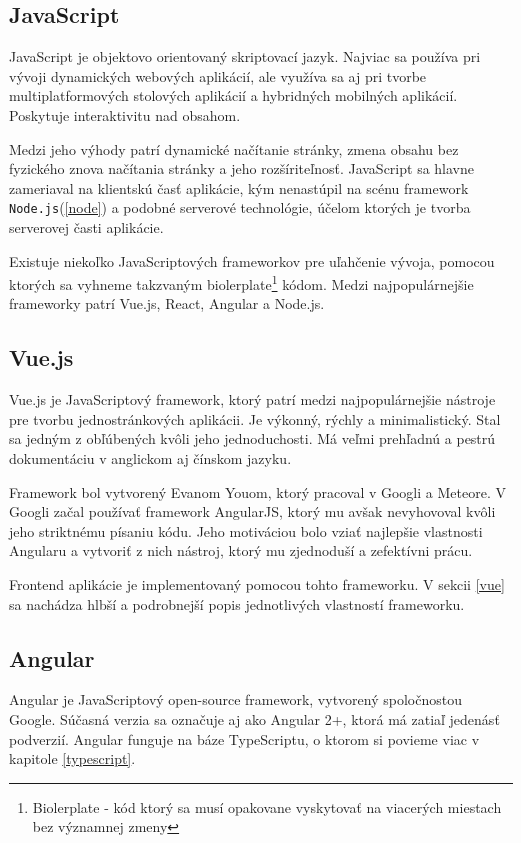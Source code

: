 \subsection{JavaScript}
JavaScript je objektovo orientovaný skriptovací jazyk. Najviac sa používa pri vývoji dynamických webových aplikácií, ale využíva sa aj pri tvorbe multiplatformových stolových aplikácií a hybridných mobilných aplikácií. Poskytuje interaktivitu nad obsahom. 

Medzi jeho výhody patrí dynamické načítanie stránky, zmena obsahu bez fyzického znova načítania stránky a jeho rozšíriteľnosť. JavaScript sa hlavne zameriaval na klientskú časť aplikácie, kým nenastúpil na scénu framework \texttt{Node.js}(\ref{node}) a podobné serverové technológie, účelom ktorých je tvorba serverovej časti aplikácie.

Existuje niekoľko JavaScriptových frameworkov pre uľahčenie vývoja, pomocou ktorých sa vyhneme takzvaným biolerplate\footnote{Biolerplate - kód ktorý sa musí opakovane vyskytovať na viacerých miestach bez významnej zmeny} kódom. Medzi najpopulárnejšie frameworky patrí Vue.js, React, Angular a Node.js.

\subsection{Vue.js}
Vue.js\cite{vue-guide} je JavaScriptový framework, ktorý patrí medzi najpopulárnejšie nástroje pre tvorbu jednostránkových aplikácii. Je výkonný, rýchly a minimalistický. Stal sa jedným z obľúbených kvôli jeho jednoduchosti. Má veľmi prehľadnú a pestrú dokumentáciu v anglickom aj čínskom jazyku.

Framework bol vytvorený Evanom Youom, ktorý pracoval v Googli a Meteore. V Googli začal používať framework AngularJS, ktorý mu avšak nevyhovoval kvôli jeho striktnému písaniu kódu. Jeho motiváciou bolo vziať najlepšie vlastnosti Angularu a vytvoriť z nich nástroj, ktorý mu zjednoduší a zefektívni prácu.

Frontend aplikácie je implementovaný pomocou tohto frameworku. V sekcii \ref{vue} sa nachádza hlbší a podrobnejší popis jednotlivých vlastností frameworku.

\subsection{Angular}
Angular\cite{angular} je JavaScriptový open-source framework, vytvorený spoločnostou Google. Súčasná verzia sa označuje aj ako Angular 2+, ktorá má zatiaľ jedenásť podverzií. Angular funguje na báze TypeScriptu, o ktorom si povieme viac v kapitole \ref{typescript}.

